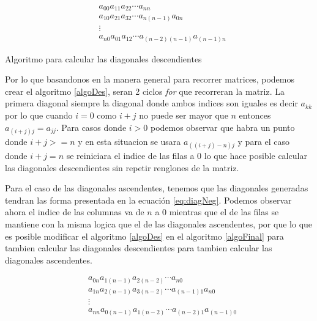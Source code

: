 \documentclass[10pt]{IEEEtran}
\begin{document}
\begin{equation}
  \label{eq:diagPos}
  \begin{aligned}
    &a_{00}a_{11}a_{22}\cdots a_{nn}\\
    &a_{10}a_{21}a_{32}\cdots a_{n(n-1)}a_{0n}\\
    &\vdots \\
    &a_{n0}a_{01}a_{12}\cdots a_{(n-2)(n-1)}a_{(n-1)n}
  \end{aligned}
\end{equation}

\begin{algorithm}
  \SetAlgoLined
  \caption{Algoritmo para calcular las diagonales descendientes}
  \label{algoDes}
\end{algorithm}

Por lo que basandonos en la manera general para recorrer matrices, podemos crear el algoritmo \ref{algoDes}, seran 2 ciclos \textit{for} que recorreran la matriz. La primera diagonal siempre la diagonal donde ambos indices son iguales es decir $a_{kk}$ por lo que cuando $i = 0$ como $i + j$ no puede ser mayor que $n$ entonces $a_{(i+j)j} = a_{jj}$. Para casos donde $i > 0$ podemos observar que habra un punto donde $i + j >= n$ y en esta situacion se usara $a_{((i+j)-n)j}$ y para el caso donde $i + j = n$ se reiniciara el indice de las filas a $0$ lo que hace posible calcular las diagonales descendientes sin repetir renglones de la matriz.

Para el caso de las diagonales ascendentes, tenemos que las diagonales generadas tendran las forma presentada en la ecuación \ref{eq:diagNeg}. Podemos observar ahora el indice de las columnas va de $n$ a $0$ mientras que el de las filas se mantiene con la misma logica que el de las diagonales ascendentes, por que lo que es posible modificar el algoritmo \ref{algoDes}  en el algoritmo \ref{algoFinal} para tambien calcular las diagonales descendientes para tambien calcular las diagonales ascendentes.

\begin{equation}
  \label{eq:diagNeg}
  \begin{aligned}
    &a_{0n}a_{1(n-1)}a_{2(n-2)}\cdots a_{n0}\\
    &a_{1n}a_{2(n-1)}a_{3(n-2)}\cdots a_{(n-1)1}a_{n0}\\
    &\vdots \\
    &a_{nn}a_{0(n-1)}a_{1(n-2)}\cdots a_{(n-2)1}a_{(n-1)0}
  \end{aligned}
\end{equation}
\end{document}
